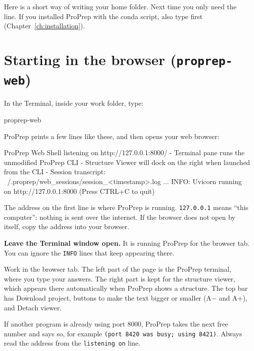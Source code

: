 Here \file{~} is a short way of writing your home folder. Next time you only
need the  line. If you installed ProPrep with the conda script, also
type  first (Chapter~\ref{ch:installation}).

\section{Starting in the browser (\texttt{proprep-web})}\label{sec:starting-web}

\begin{steps}
  \item In the Terminal, inside your work folder, type:
\begin{terminal}
proprep-web
\end{terminal}
  \item ProPrep prints a few lines like these, and then opens your web browser:
\begin{screen}
ProPrep Web Shell listening on http://127.0.0.1:8000/
  - Terminal pane runs the unmodified ProPrep CLI
  - Structure Viewer will dock on the right when launched from the CLI
  - Session transcript: ~/.proprep/web_sessions/session_<timestamp>.log
...
INFO:     Uvicorn running on http://127.0.0.1:8000 (Press CTRL+C to quit)
\end{screen}
  The address on the first line is where ProPrep is running. \texttt{127.0.0.1}
  means ``this computer'': nothing is sent over the internet. If the browser
  does not open by itself, copy the address into your browser.
  \item \textbf{Leave the Terminal window open.} It is running ProPrep for the
  browser tab. You can ignore the \texttt{INFO} lines that keep appearing there.
  \item Work in the browser tab. The left part of the page is the ProPrep
  terminal, where you type your answers. The right part is kept for the
  structure viewer, which appears there automatically when ProPrep shows a
  structure. The top bar has \textsf{Download project}, buttons to make the text
  bigger or smaller (\textsf{A$-$} and \textsf{A+}), and \textsf{Detach viewer}.
\end{steps}

\begin{tip}
If another program is already using port 8000, ProPrep takes the next free
number and says so, for example \texttt{(port 8420 was busy; using 8421)}.
Always read the address from the \texttt{listening on} line.
\end{tip}

